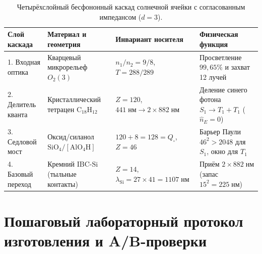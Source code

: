 \documentclass[11pt,a4paper]{article}
\theoremstyle{plain}
\theoremstyle{definition}
\begin{document}
\begin{table}[htbp]
\centering
\caption{Четырёхслойный бесфононный каскад солнечной ячейки с согласованным импедансом ($d=3$).}
\label{tab:solar-cascade}
\small
\begin{tabular}{@{}llll@{}}
\toprule
\textbf{Слой каскада} & \textbf{Материал и геометрия} & \textbf{Инвариант носителя} & \textbf{Физическая функция} \\
\midrule
1. Входная оптика & Кварцевый микрорельеф $O_2(3)$ & $n_1/n_2 = 9/8$, $T = 288/289$ & Просветление $99{,}65\%$ и захват 12 лучей \\
2. Делитель кванта & Кристаллический тетрацен $\mathrm{C_{18}H_{12}}$ & $Z = 120$, $441\;\text{нм}\to 2\times 882\;\text{нм}$ & Деление синего фотона $S_1\to T_1+T_1$ ($\hat{n}_E=0$) \\
3. Седловой мост & Оксид/силанол $\mathrm{SiO_4}/[\mathrm{AlO_4H}]$ & $120+8=128=Q_\square$, $Z=46$ & Барьер Паули $46^2>2048$ для $S_1$, окно для $T_1$ \\
4. Базовый переход & Кремний IBC-$\mathrm{Si}$ (тыльные контакты) & $Z=14$, $\lambda_{\mathrm{Si}}=27\times 41=1107\;\text{нм}$ & Приём $2\times 882\;\text{нм}$ (запас $15^2=225\;\text{нм}$) \\
\bottomrule
\end{tabular}
\end{table}

\section{Пошаговый лабораторный протокол изготовления и A/B-проверки}
\label{sec:experimental-protocol}
\end{document}
